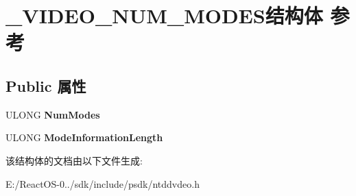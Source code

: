 \hypertarget{struct___v_i_d_e_o___n_u_m___m_o_d_e_s}{}\section{\+\_\+\+V\+I\+D\+E\+O\+\_\+\+N\+U\+M\+\_\+\+M\+O\+D\+E\+S结构体 参考}
\label{struct___v_i_d_e_o___n_u_m___m_o_d_e_s}
\subsection*{Public 属性}
\begin{DoxyCompactItemize}
\item 
\mbox{\label{struct___v_i_d_e_o___n_u_m___m_o_d_e_s_a63fd8315747aa72c85c06f4a9183d0c6}} 
U\+L\+O\+NG {\bfseries Num\+Modes}
\item 
\mbox{\label{struct___v_i_d_e_o___n_u_m___m_o_d_e_s_ae84ae8ae9325b2d01c28e5a519d2d72e}} 
U\+L\+O\+NG {\bfseries Mode\+Information\+Length}
\end{DoxyCompactItemize}


该结构体的文档由以下文件生成\+:\begin{DoxyCompactItemize}
\item 
E\+:/\+React\+O\+S-\/0../sdk/include/psdk/ntddvdeo.\+h\end{DoxyCompactItemize}

